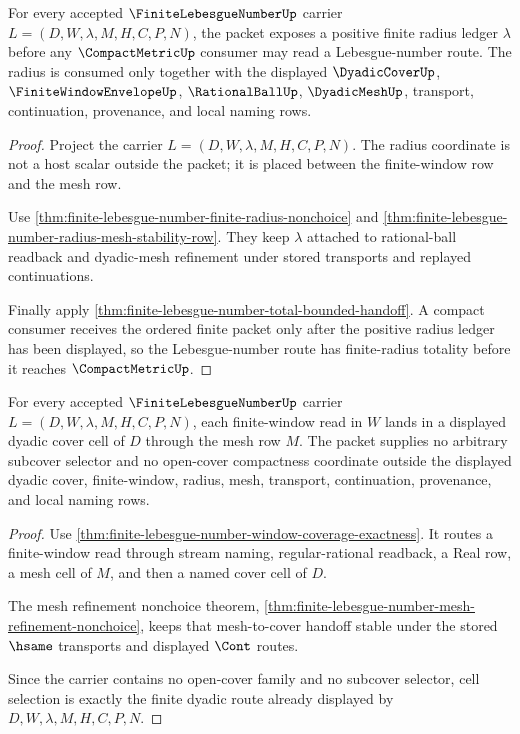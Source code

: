 \begin{theorem}
\label{thm:finite-lebesgue-number-positive-radius-totality}
For every accepted $\FiniteLebesgueNumberUp$ carrier $L=(D,W,\lambda,M,H,C,P,N)$, the packet exposes a positive finite radius ledger $\lambda$ before any $\CompactMetricUp$ consumer may read a Lebesgue-number route. The radius is consumed only together with the displayed $\DyadicCoverUp$, $\FiniteWindowEnvelopeUp$, $\RationalBallUp$, $\DyadicMeshUp$, transport, continuation, provenance, and local naming rows.
\end{theorem}
\begin{proof}
Project the carrier $L=(D,W,\lambda,M,H,C,P,N)$. The radius coordinate is not a host scalar outside the packet; it is placed between the finite-window row and the mesh row.

Use \autoref{thm:finite-lebesgue-number-finite-radius-nonchoice} and \autoref{thm:finite-lebesgue-number-radius-mesh-stability-row}. They keep $\lambda$ attached to rational-ball readback and dyadic-mesh refinement under stored transports and replayed continuations.

Finally apply \autoref{thm:finite-lebesgue-number-total-bounded-handoff}. A compact consumer receives the ordered finite packet only after the positive radius ledger has been displayed, so the Lebesgue-number route has finite-radius totality before it reaches $\CompactMetricUp$.
\end{proof}

\begin{theorem}
\label{thm:finite-lebesgue-number-dyadic-cover-cell-selection}
For every accepted $\FiniteLebesgueNumberUp$ carrier $L=(D,W,\lambda,M,H,C,P,N)$, each finite-window read in $W$ lands in a displayed dyadic cover cell of $D$ through the mesh row $M$. The packet supplies no arbitrary subcover selector and no open-cover compactness coordinate outside the displayed dyadic cover, finite-window, radius, mesh, transport, continuation, provenance, and local naming rows.
\end{theorem}
\begin{proof}
Use \autoref{thm:finite-lebesgue-number-window-coverage-exactness}. It routes a finite-window read through stream naming, regular-rational readback, a Real row, a mesh cell of $M$, and then a named cover cell of $D$.

The mesh refinement nonchoice theorem, \autoref{thm:finite-lebesgue-number-mesh-refinement-nonchoice}, keeps that mesh-to-cover handoff stable under the stored $\hsame$ transports and displayed $\Cont$ routes.

Since the carrier contains no open-cover family and no subcover selector, cell selection is exactly the finite dyadic route already displayed by $D,W,\lambda,M,H,C,P,N$.
\end{proof}


